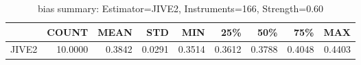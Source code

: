 \begin{table}[ht]
\centering
\caption{bias summary: Estimator=JIVE2, Instruments=166, Strength=0.60}
\begin{tabular}{lrrrrrrrr}
\toprule
 & COUNT & MEAN & STD & MIN & 25\% & 50\% & 75\% & MAX \\
\midrule
JIVE2 & 10.0000 & 0.3842 & 0.0291 & 0.3514 & 0.3612 & 0.3788 & 0.4048 & 0.4403 \\
\bottomrule
\end{tabular}
\end{table}
